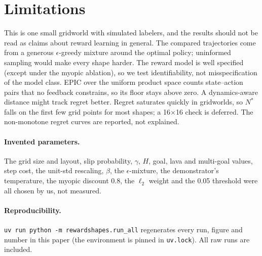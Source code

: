 \documentclass[10pt]{article}
\begin{document}
\section{Limitations}
This is one small gridworld with simulated labelers, and the results should not be read as claims about reward learning in general. The
compared trajectories come from a generous $\epsilon$-greedy mixture around the optimal policy; uninformed sampling would make every shape
harder. The reward model is well specified (except under the myopic ablation), so we test identifiability, not misspecification of the model class.
EPIC over the uniform product space counts state--action pairs that no feedback constrains, so its floor stays above zero. A dynamics-aware
distance \citep{wulfe2022dard} might track regret better. Regret saturates quickly in gridworlds, so $N^*$ falls on the first few grid points
for most shapes; a 16$\times$16 check is deferred. The non-monotone regret curves are reported, not explained.

\paragraph{Invented parameters.} The grid size and layout, slip probability, $\gamma$, $H$, goal, lava and multi-goal values, step cost, the
unit-std rescaling, $\beta$, the $\epsilon$-mixture, the demonstrator's temperature, the myopic discount 0.8, the $\ell_2$ weight and the 0.05 threshold
were all chosen by us, not measured.

\paragraph{Reproducibility.} \texttt{uv run python -m rewardshapes.run\_all} regenerates every run, figure and number in this paper
(the environment is pinned in \texttt{uv.lock}). All raw runs are included.




\end{document}
